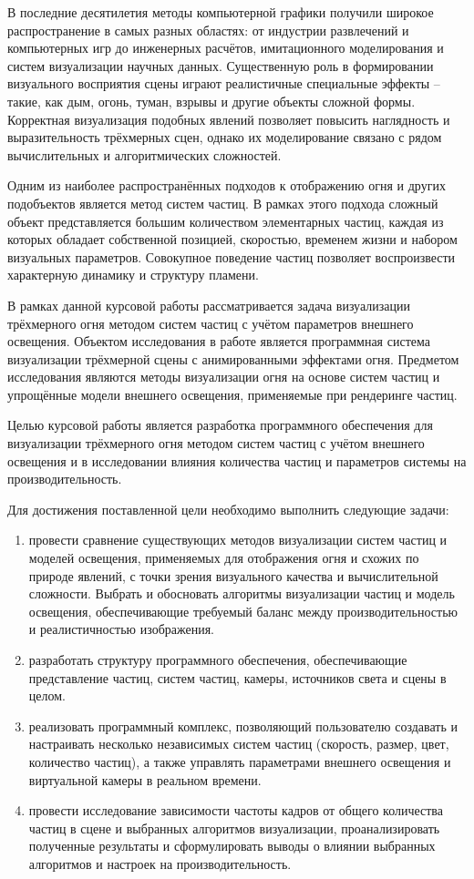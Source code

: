 
В последние десятилетия методы компьютерной графики получили широкое распространение в самых разных областях: от индустрии развлечений и компьютерных игр до инженерных расчётов, имитационного моделирования и систем визуализации научных данных. Существенную роль в формировании визуального восприятия сцены играют реалистичные специальные эффекты -- такие, как дым, огонь, туман, взрывы и другие объекты сложной формы. Корректная визуализация подобных явлений позволяет повысить наглядность и выразительность трёхмерных сцен, однако их моделирование связано с рядом вычислительных и алгоритмических сложностей.

Одним из наиболее распространённых подходов к отображению огня и других подобъектов является метод систем частиц. В рамках этого подхода сложный объект представляется большим количеством элементарных частиц, каждая из которых обладает собственной позицией, скоростью, временем жизни и набором визуальных параметров. Совокупное поведение частиц позволяет воспроизвести характерную динамику и структуру пламени. 

В рамках данной курсовой работы рассматривается задача визуализации трёхмерного огня методом систем частиц с учётом параметров внешнего освещения. Объектом исследования в работе является программная система визуализации трёхмерной сцены с анимированными эффектами огня. Предметом исследования являются методы визуализации огня на основе систем частиц и упрощённые модели внешнего освещения, применяемые при рендеринге частиц.

Целью курсовой работы является разработка программного обеспечения для визуализации трёхмерного огня методом систем частиц с учётом внешнего освещения и в исследовании влияния количества частиц и параметров системы на производительность.

Для достижения поставленной цели необходимо выполнить следующие задачи:

\begin{enumerate}
	\item провести сравнение существующих методов визуализации систем частиц и моделей освещения, применяемых для отображения огня и схожих по природе явлений, с точки зрения визуального качества и вычислительной сложности. Выбрать и обосновать алгоритмы визуализации частиц и модель освещения, обеспечивающие требуемый баланс между производительностью и реалистичностью изображения.
	\item разработать структуру программного обеспечения, обеспечивающие представление частиц, систем частиц, камеры, источников света и сцены в целом.
	\item реализовать программный комплекс, позволяющий пользователю создавать и настраивать несколько независимых систем частиц (скорость, размер, цвет, количество частиц), а также управлять параметрами внешнего освещения и виртуальной камеры в реальном времени.
	\item провести исследование зависимости частоты кадров от общего количества частиц в сцене и выбранных алгоритмов визуализации, проанализировать полученные результаты и сформулировать выводы о влиянии выбранных алгоритмов и настроек на производительность.
\end{enumerate}

\clearpage
